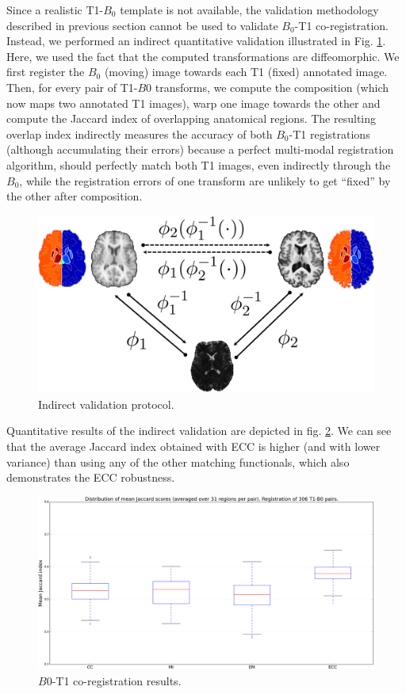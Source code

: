 Since a realistic T1-$B_{0}$ template is not available, the validation methodology described in previous section cannot be used to validate $B_{0}$-T1 co-registration. Instead, we performed an indirect quantitative validation illustrated in Fig. \ref{fig:indirect_validation}. Here, we used the fact that the computed transformations are diffeomorphic. We first register the $B_{0}$ (moving) image towards each T1 (fixed) annotated image. Then, for every pair of T1-$B0$ transforms, we compute the composition (which now maps two annotated T1 images), warp one image towards the other and compute the Jaccard index of overlapping anatomical regions. The resulting overlap index indirectly measures the accuracy of both $B_{0}$-T1 registrations (although accumulating their errors) because a perfect multi-modal registration algorithm, should perfectly match both T1 images, even indirectly through the $B_{0}$, while the registration errors of one transform are unlikely to get ``fixed'' by the other after composition.
\begin{figure}[H]
\centering
    \includegraphics[width=\linewidth]{./images/new_validation.png}
    \caption{Indirect validation protocol.}
\label{fig:indirect_validation}
\end{figure}

Quantitative results of the indirect validation are depicted in fig. \ref{fig:indirect_validation_boxplots}. We can see that the average Jaccard index obtained with ECC is higher (and with lower variance) than using any of the other matching functionals, which also demonstrates the ECC robustness.
\begin{figure}[H]
\centering
    \includegraphics[width=\linewidth]{./images/T1B0Result/jaccard_boxplots_T1_B0.png}
    \caption{$B0$-T1 co-registration results.}
\label{fig:indirect_validation_boxplots}
\end{figure}

